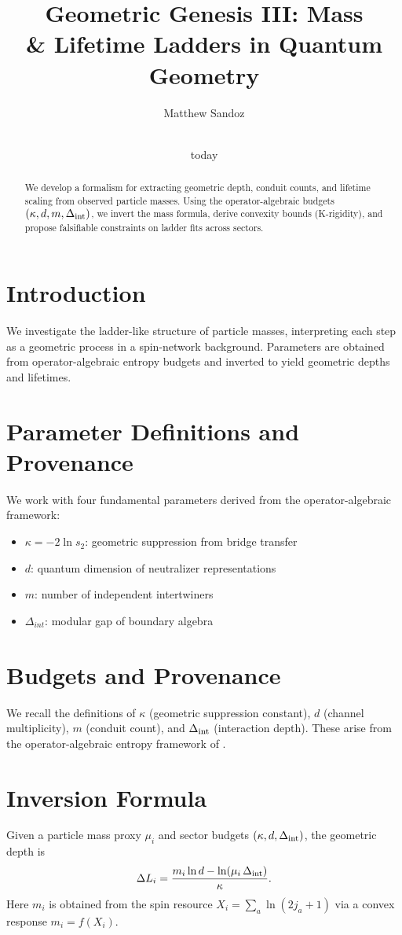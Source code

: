 \documentclass[11pt]{article}
\title{Geometric Genesis III: Mass \\& Lifetime Ladders in Quantum Geometry}
\author{Matthew Sandoz}
\date{\\today}
\theoremstyle{plain}
\theoremstyle{definition}
\begin{document}
\maketitle

\begin{abstract}
  We develop a formalism for extracting geometric depth, conduit counts, and lifetime scaling from observed particle masses. Using the operator-algebraic budgets $(\kappa,d,m,\Delta_{\rm int})$, we invert the mass formula, derive convexity bounds (K-rigidity), and propose falsifiable constraints on ladder fits across sectors.
\end{abstract}

\section{Introduction}
We investigate the ladder-like structure of particle masses, interpreting each step as a geometric process in a spin-network background. Parameters are obtained from operator-algebraic entropy budgets and inverted to yield geometric depths and lifetimes.

\section{Parameter Definitions and Provenance}
We work with four fundamental parameters derived from the operator-algebraic framework:
\begin{itemize}
  \item $\kappa = -2\ln s_2$: geometric suppression from bridge transfer
  \item $d$: quantum dimension of neutralizer representations
  \item $m$: number of independent intertwiners
  \item $\Delta_{int}$: modular gap of boundary algebra
\end{itemize}

\section{Budgets and Provenance}
We recall the definitions of $\kappa$ (geometric suppression constant), $d$ (channel multiplicity), $m$ (conduit count), and $\Delta_{\rm int}$ (interaction depth). These arise from the operator-algebraic entropy framework of \cite{bridge-monotonicity,entropy-rewrites,operator-theory}.

\section{Inversion Formula}
Given a particle mass proxy $\mu_i$ and sector budgets $(\kappa,d,\Delta_{\rm int})$, the geometric depth is
\begin{equation}
  \Delta L_i = \frac{m_i\ln d - \ln(\mu_i\,\Delta_{\rm int})}{\kappa}.
\end{equation}
Here $m_i$ is obtained from the spin resource $X_i = \sum_a \ln(2j_a+1)$ via a convex response $m_i = f(X_i)$.
\end{document}
